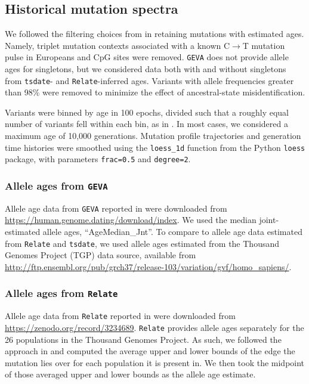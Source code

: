 \documentclass[]{article}
\newcommand{\GEVA}{\texttt{GEVA}\xspace}
\newcommand{\tsdate}{\texttt{tsdate}\xspace}
\newcommand{\relate}{\texttt{Relate}\xspace}
\begin{document}
\subsection*{Historical mutation spectra}

We followed the filtering choices from \citet{wang2023human} in retaining
mutations with estimated ages. Namely, triplet mutation contexts associated
with a known C$\rightarrow$T mutation pulse in Europeans
\citep{harris2015evidence} and CpG sites were removed. \GEVA does not provide
allele ages for singletons, but we considered data both with and without
singletons from \tsdate- and \relate-inferred ages. Variants with allele
frequencies greater than 98\% were removed to minimize the effect of
ancestral-state misidentification.

Variants were binned by age in 100 epochs, divided such that a roughly equal
number of variants fell within each bin, as in \citet{wang2023human}. In most
cases, we considered a maximum age of 10,000 generations. Mutation profile
trajectories and generation time histories were smoothed using the
\texttt{loess\_1d} function from the Python \texttt{loess} package, with
parameters \texttt{frac=0.5} and \texttt{degree=2}.

\subsubsection*{Allele ages from \GEVA}

Allele age data from \GEVA reported in \citet{albers2020dating} were downloaded
from \url{https://human.genome.dating/download/index}. We used the median
joint-estimated allele ages, ``AgeMedian\_Jnt''. To compare to allele age data
estimated from \relate and \tsdate, we used allele ages estimated from the
Thousand Genomes Project (TGP) data source, available from
\url{http://ftp.ensembl.org/pub/grch37/release-103/variation/gvf/homo_sapiens/}.

\subsubsection*{Allele ages from \relate}

Allele age data from \relate reported in \citet{speidel2019method} were
downloaded from \url{https://zenodo.org/record/3234689}. \relate provides
allele ages separately for the 26 populations in the Thousand Genomes Project.
As such, we followed the approach in \citet{wohns2022unified} and computed the
average upper and lower bounds of the edge the mutation lies over for each
population it is present in. We then took the midpoint of those averaged
upper and lower bounds as the allele age estimate.
\end{document}
